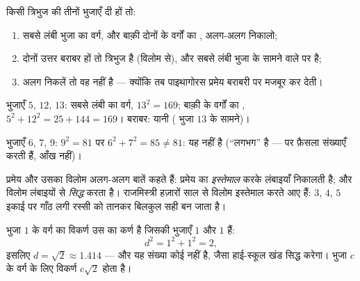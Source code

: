 \begin{method}[समकोण की जाँच]\label{met:g8:pythagoras:test}
किसी त्रिभुज की तीनों भुजाएँ दी हों तो:
\begin{enumerate}
  \item सबसे लंबी भुजा का वर्ग, और बाक़ी दोनों के वर्गों का ,
        अलग-अलग निकालो;
  \item दोनों उत्तर बराबर हों तो त्रिभुज  है (विलोम से), और
         सबसे लंबी भुजा के सामने वाले  पर है;
  \item अलग निकलें तो वह  नहीं है --- क्योंकि तब पाइथागोरस
        प्रमेय बराबरी पर मजबूर कर देती।
\end{enumerate}
\end{method}

\begin{example}\label{ex:g8:pythagoras:test}
भुजाएँ $5$, $12$, $13$: सबसे लंबी का वर्ग, $13^2 = 169$; बाक़ी के
वर्गों का , $5^2 + 12^2 = 25 + 144 = 169$। बराबर: यानी  ( भुजा $13$ के सामने)।

भुजाएँ $6$, $7$, $9$: $9^2 = 81$ पर $6^2 + 7^2 = 85 \neq 81$: यह
 नहीं है (``लगभग'' है --- पर फ़ैसला संख्याएँ करती हैं,
आँख नहीं)।
\end{example}

\begin{remark}[प्रमेय बनाम विलोम]
प्रमेय और उसका विलोम अलग-अलग बातें कहते हैं: प्रमेय  का
\emph{इस्तेमाल} करके लंबाइयाँ निकालती है; और विलोम लंबाइयों से 
\emph{सिद्ध} करता है। राजमिस्त्री हज़ारों साल से विलोम इस्तेमाल करते
आए हैं: $3$, $4$, $5$ इकाई पर गाँठ लगी रस्सी को तानकर बिलकुल सही
 बन जाता है।
\end{remark}

\begin{example}[वर्ग का विकर्ण]\label{ex:g8:pythagoras:diagonal}
भुजा $1$ के वर्ग का विकर्ण उस  का कर्ण है जिसकी 
भुजाएँ $1$ और $1$ हैं:
\[
d^2 = 1^2 + 1^2 = 2 ,
\]
इसलिए $d = \sqrt2 \approx 1.414$ --- और यह संख्या कोई  नहीं है,
जैसा हाई-स्कूल खंड सिद्ध करेगा। भुजा $c$ के वर्ग के लिए विकर्ण
$c\sqrt2$ होता है।
\end{example}

